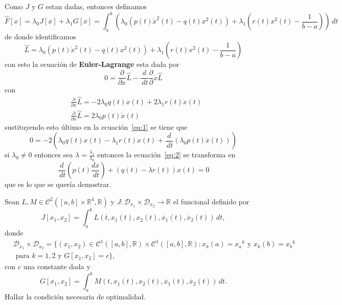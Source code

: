 \documentclass{ejercicios}
\begin{document}
\begin{solution}
  \noindent
  Como $J$ y $G$ estan dadas, entonces definamos 
  \[\hat{F}[x] = \lambda_0J[x] + \lambda_1G[x] = \int_{a}^{b} \left(\lambda_0\left(p(t)\dot{x}^2(t) - q(t)x^2(t) \right) + \lambda_1\left(r(t)x^2(t) - \frac{1}{b-a}\right)\right)\,dt\]
  de donde identificamos 
  \[\hat{L} = \lambda_0\left(p(t)\dot{x}^2(t) - q(t)x^2(t) \right) + \lambda_1\left(r(t)x^2(t) - \frac{1}{b-a}\right)\]
  con esto la ecuación de \textbf{Euler-Lagrange} esta dada por 
  \begin{equation}\label{eq:1}
  0 = \frac{\partial}{\partial x}\hat{L} - \frac{d}{\,dt}\frac{\partial}{\partial}\dot{x}\hat{L}
  \end{equation}
  con 
  \[
  \begin{aligned}
    & \frac{\partial}{\partial x}\hat{L} = -2\lambda_0q(t)x(t) + 2\lambda_1r(t)x(t)\\ 
    & \frac{\partial}{\partial\dot{x}}\hat{L} = 2\lambda_0p(t)\dot{x}(t)
  \end{aligned}
  \]
  sustituyendo esto último en la ecuación~\ref{eq:1} se tiene que 
  \begin{equation}\label{eq:2}
  0 = -2\left(\lambda_0q(t)x(t) - \lambda_1r(t)x(t) + \frac{d}{\,dt}\left(\lambda_0p(t)\dot{x}(t)\right)\right)
  \end{equation}
  si $\lambda_0\neq 0$ entonces sea $\lambda = \frac{\lambda_1}{\lambda_0}$ entonces la ecuación~\ref{eq:2} se transforma en 
  \[\frac{d}{\,dt}\left(p(t)\frac{dx}{\,dt}\right) + (q(t) - \lambda r(t))x(t) = 0\]
  que es lo que se quería demostrar.
\end{solution}

\begin{exercise}\label{ej:4}
  Sean $L,M\in\mathcal{C}^2([a,b]\times\mathbb{R}^4,\mathbb{R})$ y $J:\mathcal{D}_{x_1}\times\mathcal{D}_{x_2}\to\mathbb{R}$ el funcional definido por
  \[
    J[x_1,x_2] = \int_{a}^{b}L(t,x_1(t),x_2(t),\dot{x_1}(t),\dot{x_2}(t))\,dt,
  \]
  donde
  \[
  \begin{aligned}
    & \mathcal{D}_{x_1}\times\mathcal{D}_{x_2} = \{(x_1,x_2)\in\mathcal{C}^1([a,b],\mathbb{R})\times\mathcal{C}^1([a,b],\mathbb{R}):x_k(a) = {x_a}^k\text{ y }x_k(b) = {x_b}^k \\ 
    & \text{ para } k = 1,2 \text{ y } G[x_1,x_2] = c\},
  \end{aligned}
\]
  con $c$ una constante dada y 
  \[
    G[x_1,x_2] = \int_{a}^{b}M(t,x_1(t),x_2(t),\dot{x_1}(t),\dot{x_2}(t))\,dt .
  \]
  Hallar la condición necesaria de optimalidad.
\end{exercise}
\end{document}
